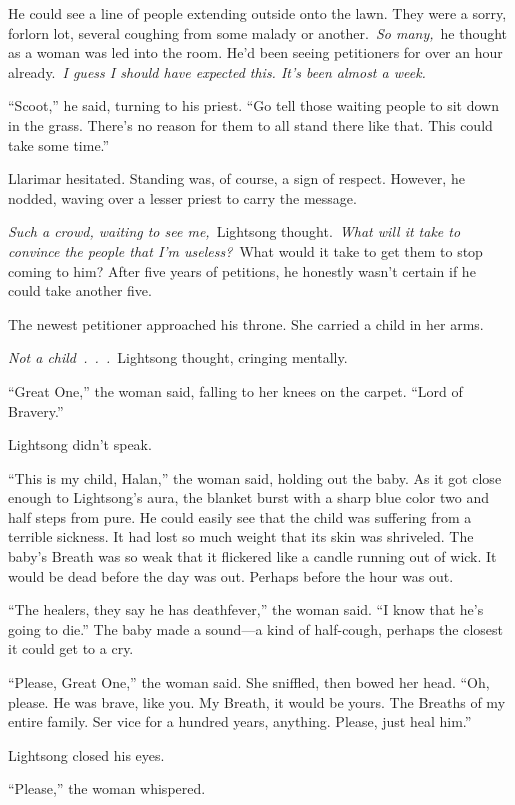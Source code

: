 He could see a line of people extending outside onto the lawn. They were a sorry, forlorn lot, several coughing from some malady or another.~\textit{So many,}~he thought as a woman was led into the room. He’d been seeing petitioners for over an hour already.~\textit{I guess I should have expected this. It’s been almost a week.}

“Scoot,” he said, turning to his priest. “Go tell those waiting people to sit down in the grass. There’s no reason for them to all stand there like that. This could take some time.”

Llarimar hesitated. Standing was, of course, a sign of respect. However, he nodded, waving over a lesser priest to carry the message.

\textit{Such a crowd, waiting to see me,}~Lightsong thought.~\textit{What will it take to convince the people that I’m useless?}~What would it take to get them to stop coming to him? After five years of petitions, he honestly wasn’t certain if he could take another five.

The newest petitioner approached his throne. She carried a child in her arms.

\textit{Not a child~.~.~.}~Lightsong thought, cringing mentally.

“Great One,” the woman said, falling to her knees on the carpet. “Lord of Bravery.”

Lightsong didn’t speak.

“This is my child, Halan,” the woman said, holding out the baby. As it got close enough to Lightsong’s aura, the blanket burst with a sharp blue color two and half steps from pure. He could easily see that the child was suffering from a terrible sickness. It had lost so much weight that its skin was shriveled. The baby’s Breath was so weak that it flickered like a candle running out of wick. It would be dead before the day was out. Perhaps before the hour was out.

“The healers, they say he has deathfever,” the woman said. “I know that he’s going to die.” The baby made a sound—a kind of half-cough, perhaps the closest it could get to a cry.

“Please, Great One,” the woman said. She sniffled, then bowed her head. “Oh, please. He was brave, like you. My Breath, it would be yours. The Breaths of my entire family. Ser vice for a hundred years, anything. Please, just heal him.”

Lightsong closed his eyes.

“Please,” the woman whispered.

